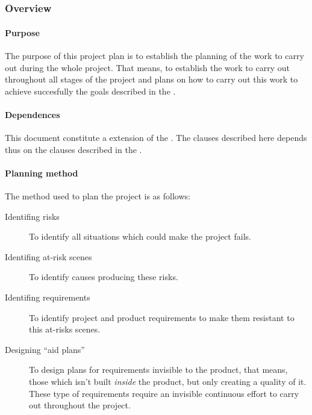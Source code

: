 \documentclass[twocolumn]{article}
\begin{document}

\part{\favpl}
\label{part:st0-plan}

\section{Overview}
\subsection{Purpose}
The purpose of this project plan is to establish the planning of the
work to carry out during the whole project. That means, to establish
the work to carry out throughout all stages of the project and plans
on how to carry out this work to achieve succesfully the goals
described in the \favp.

\subsection{Dependences}
This document constitute a extension of the \favc. The clauses
described here depends thus on the clauses described in the \favc.

\subsection{Planning method}
\label{ssec:planning-method}
The method used to plan the project is as follows:

\begin{description}
\item[Identifing risks] To identify all situations which could make the
  project fails.
\item[Identifing at-risk scenes] To identify causes producing these risks.
\item[Identifing requirements] To identify project and product
  requirements to make them resistant to this at-risks scenes.
\item[Designing ``aid plans''] To design plans for
  requirements invisible to the product, that means, those which isn't
  built \textit{inside} the product, but only creating a quality of
  it. These type of requirements require an invisible continuous
  effort to carry out throughout the project.
\end{description}
\end{document}
